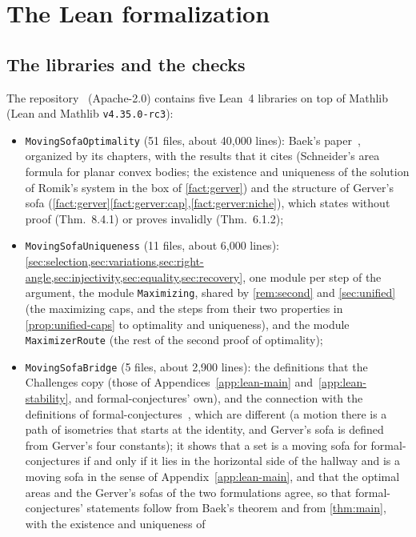 \section{The Lean formalization}\label{app:lean}

\subsection{The libraries and the checks}\label{app:formalization}

The repository~\cite{Companion} (Apache-2.0) contains five Lean~4 libraries on
top of Mathlib (Lean and Mathlib \texttt{v4.35.0-rc3}):
\begin{itemize}
\item \texttt{MovingSofaOptimality} (51 files, about 40,000 lines): Baek's
paper~\cite{Baek}, organized by its chapters, with the results that it cites
(Schneider's area formula for planar convex bodies; the existence and uniqueness
of the solution of Romik's system in the box of \cref{fact:gerver}) and the
structure of Gerver's sofa
(\cref{fact:gerver}\ref{fact:gerver:cap},\ref{fact:gerver:niche}), which
\cite{Baek} states without proof (Thm.~8.4.1) or proves invalidly (Thm.~6.1.2);
\item \texttt{MovingSofaUniqueness} (11 files, about 6,000 lines):
\cref{sec:selection,sec:variations,sec:right-angle,sec:injectivity,sec:equality,sec:recovery},
one module per step of the argument, the module \texttt{Maximizing}, shared by
\cref{rem:second} and \cref{sec:unified} (the maximizing caps, and the steps
from their two properties in \cref{prop:unified-caps} to optimality and
uniqueness), and the module \texttt{MaximizerRoute} (the rest of the second
proof of optimality);
\item \texttt{MovingSofaBridge} (5 files, about 2,900 lines): the definitions
that the Challenges copy (those of Appendices~\ref{app:lean-main}
and~\ref{app:lean-stability}, and formal-conjectures' own), and the connection
with the definitions of formal-conjectures~\cite{FormalConjectures}, which are
different (a motion there is a path of isometries that starts at the identity,
and Gerver's sofa is defined from Gerver's four constants); it shows that a set
is a moving sofa for formal-conjectures if and only if it lies in the horizontal
side of the hallway and is a moving sofa in the sense of
Appendix~\ref{app:lean-main}, and that the optimal areas and the Gerver's sofas of
the two formulations agree, so that formal-conjectures' statements follow from
Baek's theorem and from \cref{thm:main}, with the existence and uniqueness of

\end{itemize}

